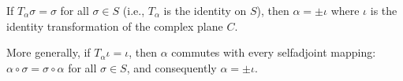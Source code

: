 If $T_{\alpha} \sigma = \sigma$ for all $\sigma \in S$ (i.e., $T_{\alpha}$ is the identity on $S$), then $\alpha = \pm \iota$ where $\iota$ is the identity transformation of the complex plane $C$.

More generally, if $T_{\alpha} \iota = \iota$, then $\alpha$ commutes with every selfadjoint mapping: $\alpha \circ \sigma = \sigma \circ \alpha$ for all $\sigma \in S$, and consequently $\alpha = \pm \iota$.
